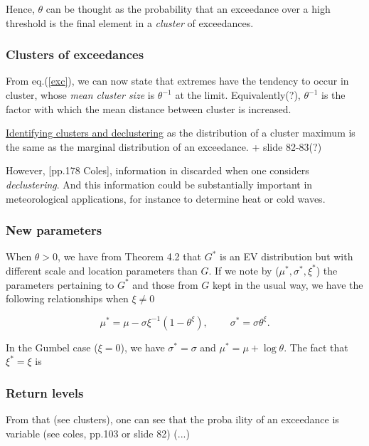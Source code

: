 \documentclass[11pt,a4paper,openany ]{book}
\begin{document}
Hence, $\theta$ can be thought as the probability that an exceedance over a high threshold is the final element in a \emph{cluster }of exceedances.

\subsubsection*{Clusters of exceedances} From eq.(\ref{exc}), we can now state that extremes have the tendency to occur in cluster, whose \emph{mean cluster size} is $\theta^{-1}$ at the limit. Equivalently(?), $\theta^{-1}$ is the factor with which the mean distance between cluster is increased.

\underline{Identifying clusters and declustering} as the distribution of a cluster maximum is the same as the marginal distribution of an
exceedance.
+ slide 82-83(?)

However, [pp.178 Coles], information in discarded when one considers \emph{declustering}. And this information could be substantially important in meteorological applications, for instance to determine heat or cold waves.



\subsubsection*{New parameters} When $\theta>0$, we have from Theorem 4.2 that $G^*$ is an EV distribution but with different scale and location parameters than $G$. If we note by ($\mu^*,\sigma^*,\xi^*$) the parameters pertaining to $G^*$ and those from $G$ kept in the usual way, we have the following relationships when $\xi\neq 0$

\begin{equation}
\mu^* = \mu-\sigma\xi^{-1}(1-\theta^{\xi}), \ \ \ \ \ \ \ \ \ \ \sigma^*=\sigma\theta^{\xi}.
\end{equation}

In the Gumbel case ($\xi=0$), we have $\sigma^*=\sigma$ and $\mu^*=\mu+\log\theta$.
The fact that $\xi^*=\xi$ is 

\subsubsection*{Return levels}

From that (see clusters), one can see that the proba ility of an exceedance is variable (see coles, pp.103 or slide 82) (...)
\end{document}
